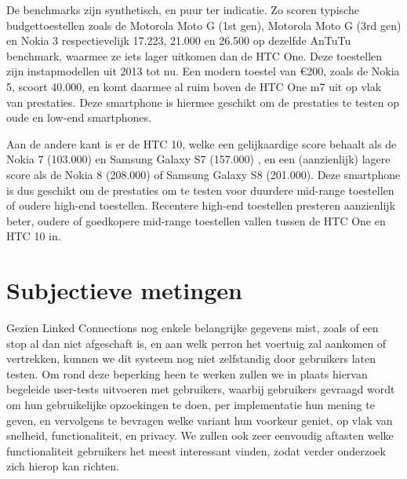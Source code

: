 De benchmarks zijn synthetisch, en puur ter indicatie. Zo scoren typische budgettoestellen zoals de Motorola Moto G (1st gen), Motorola Moto G (3rd gen) en Nokia 3 respectievelijk 17.223, 21.000 en 26.500 op dezelfde AnTuTu benchmark, waarmee ze iets lager uitkomen dan de HTC One. Deze toestellen zijn instapmodellen uit 2013 tot nu. Een modern toestel van €200, zoals de Nokia 5, scoort 40.000, en komt daarmee al ruim boven de HTC One m7 uit op vlak van prestaties. Deze smartphone is hiermee geschikt om de prestaties te testen op oude en low-end smartphones.

Aan de andere kant is er de HTC 10, welke een gelijkaardige score behaalt als de Nokia 7 (103.000) en Samsung Galaxy S7 (157.000) , en een (aanzienlijk) lagere score als de Nokia 8 (208.000) of Samsung Galaxy S8 (201.000). Deze smartphone is dus geschikt om de prestaties om te testen voor duurdere mid-range toestellen of oudere high-end toestellen. Recentere high-end toestellen presteren aanzienlijk beter, oudere of goedkopere mid-range toestellen vallen tussen de HTC One en HTC 10 in. 

\section{Subjectieve metingen}

Gezien Linked Connections nog enkele belangrijke gegevens mist, zoals of een stop al dan niet afgeschaft is, en aan welk perron het voertuig zal aankomen of vertrekken, kunnen we dit systeem nog niet zelfstandig door gebruikers laten testen. Om rond deze beperking heen te werken zullen we in plaats hiervan begeleide user-tests uitvoeren met gebruikers, waarbij gebruikers gevraagd wordt om hun gebruikelijke opzoekingen te doen, per implementatie hun mening te geven, en vervolgens te bevragen welke variant hun voorkeur geniet, op vlak van snelheid, functionaliteit, en privacy.
We zullen ook zeer eenvoudig aftasten welke functionaliteit gebruikers het meest interessant vinden, zodat verder onderzoek zich hierop kan richten.

